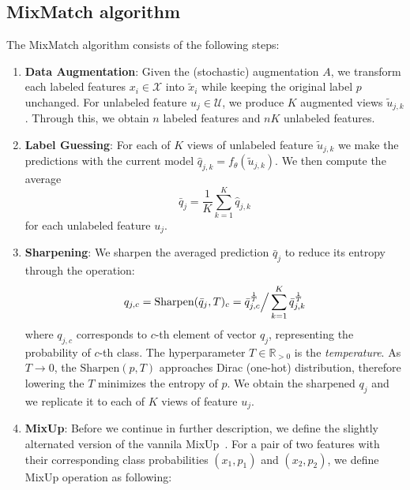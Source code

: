 \subsection{MixMatch algorithm}
The MixMatch algorithm consists of the following steps:
\begin{enumerate}
    \item \textbf{Data Augmentation}\label{data-augmentation}: Given the (stochastic) augmentation $A$, we transform each labeled features $x_i \in \mathcal{X}$ into $\tilde{x}_i$ while keeping the 
        original label $p$ unchanged. For unlabeled feature $u_j \in \mathcal{U}$, we produce $K$ augmented views $\tilde{u}_{j,k}$. Through this, we obtain $n$ labeled features and
        $nK$ unlabeled features. 
    \item \textbf{Label Guessing}\label{label-guessing}: For each of $K$ views of unlabeled feature $\tilde{u}_{j,k}$ we make the predictions with the current model 
        $\hat{q}_{j,k} = f_\theta(\tilde{u}_{j,k})$. We then compute the average
            \begin{equation*}
                \bar{q}_{j} = \frac{1}{K}\sum_{k=1}^K \hat{q}_{j,k}
            \end{equation*}
        for each unlabeled feature $u_j$.
    \item \textbf{Sharpening}\label{sharpening}: We sharpen the averaged prediction $\bar{q}_{j}$ to reduce its entropy through the operation:
            \begin{equation*}
                q_{j,c} = \text{Sharpen}(\bar{q}_{j},T)_c = \bar{q}_{j,c}^{\frac{1}{T}} \Big{/} \sum_{k=1}^{K} \bar{q}_{j,k}^{\frac{1}{T}} 
            \end{equation*}
        where $q_{j,c}$ corresponds to $c$-th element of vector $q_{j}$, representing the probability of $c$-th class. 
        The hyperparameter $T \in \mathbb{R}_{>0}$ is the \textit{temperature}. As $T\to 0$, the $\text{Sharpen}(p,T)$ approaches Dirac (one-hot) distribution, 
        therefore lowering the $T$ minimizes the entropy of $p$. We obtain the sharpened $q_{j}$ and we replicate it to each of $K$ views of feature $u_{j}$.
    \item \textbf{MixUp}: Before we continue in further description, we define the slightly alternated version of the vannila MixUp~\cite{mixup-2018}.
            For a pair of two features with their corresponding class probabilities $(x_1,p_1)$ and $(x_2,p_2)$, we define MixUp operation as following:
            \begin{align*}

\end{align*}
\end{enumerate}
